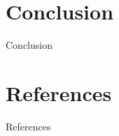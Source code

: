 \documentclass{beamer}
\begin{document}

\section{Conclusion}
\begin{frame}{Conclusion}
\end{frame}


\section{References}
\begin{frame}{References}
	\nocite{*}
	
	
\end{frame}

\end{document}
